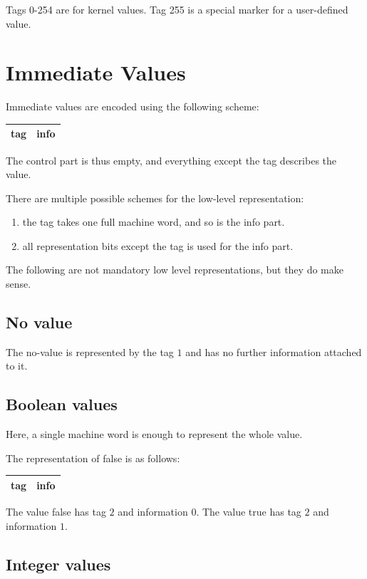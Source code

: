 \documentclass[a4paper,11pt]{article}
\begin{document}
Tags 0-254 are for kernel values.
Tag 255 is a special marker for a user-defined value.


\section{Immediate Values}

Immediate values are encoded using the following scheme:

\begin{tabular}{|l|l|}
\hline
tag & info \\
\hline
\end{tabular}

The control part is thus empty, and everything except the tag describes
 the value.

There are multiple possible schemes for the low-level representation:
\begin{enumerate}
\item the tag takes one full machine word,  and so is the info part.
\item all representation bits except the tag is used for the info part.
\end{enumerate}

The following are not mandatory low level representations, but they do make sense.

\subsection{No value}

The no-value is represented by the tag $1$ and has no further information attached to it.

\subsection{Boolean values}

Here, a single machine word is enough to represent the whole value.

The representation of false is as follows:

\begin{tabular}{|l|l|}
\hline
tag & info \\
\hline
\end{tabular}

The value false has tag $2$ and information $0$.
The value true has tag $2$ and information $1$.

\subsection{Integer values}
\end{document}
